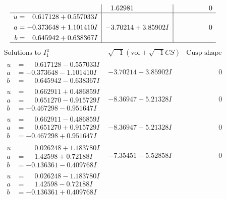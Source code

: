 \documentclass[1p]{elsarticle_modified}
\theoremstyle{definition}
\newcommand{\I}{\sqrt{-1}}
\begin{document}
$$\begin{array}{c|c|c}
 & \phantom{-}1.62981\phantom{ +0.000000I} & \phantom{-0.000000 } 0 \\ \hline\begin{aligned}
u &= \phantom{-}0.617128 + 0.557033 I \\
a &= -0.373648 + 1.101410 I \\
b &= \phantom{-}0.645942 + 0.638367 I\end{aligned}
 & -3.70214 + 3.85902 I & \phantom{-0.000000 } 0\\
 \hline 
 \end{array}$$\newpage$$\begin{array}{c|c|c}  
\text{Solutions to }I^u_{1}& \I (\text{vol} + \sqrt{-1}CS) & \text{Cusp shape}\\
 \hline 
\begin{aligned}
u &= \phantom{-}0.617128 - 0.557033 I \\
a &= -0.373648 - 1.101410 I \\
b &= \phantom{-}0.645942 - 0.638367 I\end{aligned}
 & -3.70214 - 3.85902 I & \phantom{-0.000000 } 0 \\ \hline\begin{aligned}
u &= \phantom{-}0.662911 + 0.486859 I \\
a &= \phantom{-}0.651270 - 0.915729 I \\
b &= -0.467298 - 0.951647 I\end{aligned}
 & -8.36947 + 5.21328 I & \phantom{-0.000000 } 0 \\ \hline\begin{aligned}
u &= \phantom{-}0.662911 - 0.486859 I \\
a &= \phantom{-}0.651270 + 0.915729 I \\
b &= -0.467298 + 0.951647 I\end{aligned}
 & -8.36947 - 5.21328 I & \phantom{-0.000000 } 0 \\ \hline\begin{aligned}
u &= \phantom{-}0.026248 + 1.183780 I \\
a &= \phantom{-}1.42598 + 0.72188 I \\
b &= -0.136361 - 0.409768 I\end{aligned}
 & -7.35451 - 5.52858 I & \phantom{-0.000000 } 0 \\ \hline\begin{aligned}
u &= \phantom{-}0.026248 - 1.183780 I \\
a &= \phantom{-}1.42598 - 0.72188 I \\
b &= -0.136361 + 0.409768 I\end{aligned}

\end{array}$$
\end{document}

